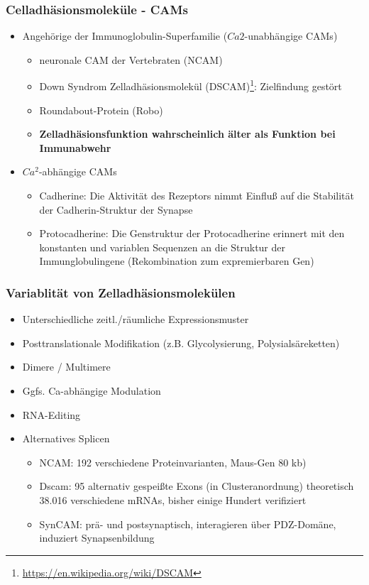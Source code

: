 \subsubsection{Celladhäsionsmoleküle - CAMs}

\begin{itemize}
	\item Angehörige der Immunoglobulin-Superfamilie ($Ca2$-unabhängige CAMs)
	\begin{itemize}
		\item neuronale CAM der Vertebraten (NCAM)
		\item Down Syndrom Zelladhäsionsmolekül (DSCAM)\footnote{\url{https://en.wikipedia.org/wiki/DSCAM}}: Zielfindung gestört
		\item Roundabout-Protein (Robo)
		\item \textbf{Zelladhäsionsfunktion wahrscheinlich älter als Funktion bei Immunabwehr}
	\end{itemize}
	\item $Ca^2$-abhängige CAMs
		\begin{itemize}
			\item Cadherine: Die Aktivität des Rezeptors nimmt Einfluß
auf die Stabilität der Cadherin-Struktur der Synapse
			\item Protocadherine: Die Genstruktur der Protocadherine erinnert mit den konstanten und variablen Sequenzen an die Struktur der Immunglobulingene (Rekombination zum expremierbaren Gen)
		\end{itemize}
\end{itemize}

\subsubsection{Variablität von Zelladhäsionsmolekülen}
\begin{itemize}
	\item Unterschiedliche zeitl./räumliche Expressionsmuster
	\item Posttranslationale Modifikation (z.B. Glycolysierung, Polysialsäreketten)
	\item Dimere / Multimere
	\item Ggfs. Ca-abhängige Modulation
	\item RNA-Editing
	\item Alternatives Splicen
	\begin{itemize}
		\item NCAM: 192 verschiedene Proteinvarianten, Maus-Gen 80 kb)
		\item Dscam: 95 alternativ gespeißte Exons (in Clusteranordnung) theoretisch 38.016 verschiedene mRNAs, bisher einige Hundert verifiziert
		\item SynCAM: prä- und postsynaptisch, interagieren über PDZ-Domäne, induziert Synapsenbildung
	\end{itemize}
\end{itemize}

